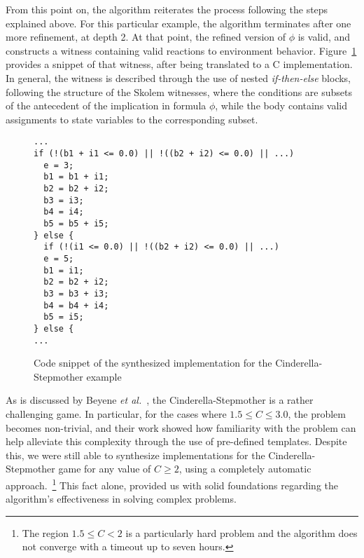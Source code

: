 From this point on, the algorithm reiterates the process following the steps
explained above. For this particular example, the algorithm terminates after one
more refinement, at depth 2. At that point, the refined version of
$\phi$ is valid, and \aeval constructs a witness containing valid reactions to
environment behavior. Figure~\ref{fg:witness} provides a snippet of
that witness, after being translated to a C implementation.
In general, the witness is described through the use of nested \textit{if-then-else} blocks, following the structure of the Skolem witnesses, where the conditions are subsets of the antecedent of
the implication in formula $\phi$, while the body contains valid assignments to
state variables to the corresponding subset.


\begin{figure}[!t]
\centering
 \begin{Verbatim}[fontsize=\footnotesize]
...
if (!(b1 + i1 <= 0.0) || !((b2 + i2) <= 0.0) || ...)
  e = 3;
  b1 = b1 + i1;
  b2 = b2 + i2;
  b3 = i3;
  b4 = i4;
  b5 = b5 + i5;
} else {
  if (!(i1 <= 0.0) || !((b2 + i2) <= 0.0) || ...)
  e = 5;
  b1 = i1;
  b2 = b2 + i2;
  b3 = b3 + i3;
  b4 = b4 + i4;
  b5 = i5;
} else {
...
 \end{Verbatim}
\caption{Code snippet of the synthesized implementation for the Cinderella-Stepmother
example}
\label{fg:witness}
\end{figure}

As is discussed by Beyene \textit{et al.}~\cite{beyene2014constraint}, the
Cinderella-Stepmother is a rather challenging game. In particular, for the
cases where $1.5 \leq C \leq 3.0$, the problem becomes non-trivial, and their
work showed how familiarity with the problem can help alleviate this complexity
through the use of pre-defined templates. Despite this, we were still
able to synthesize implementations for the Cinderella-Stepmother game for any
value of $C \geq 2$, using a completely automatic approach.~\footnote{The region $1.5\leq C < 2$ is a particularly hard problem and the algorithm does not converge with a timeout up to seven hours.} This fact alone,
provided us with solid foundations regarding the algorithm's effectiveness in
solving complex problems.
